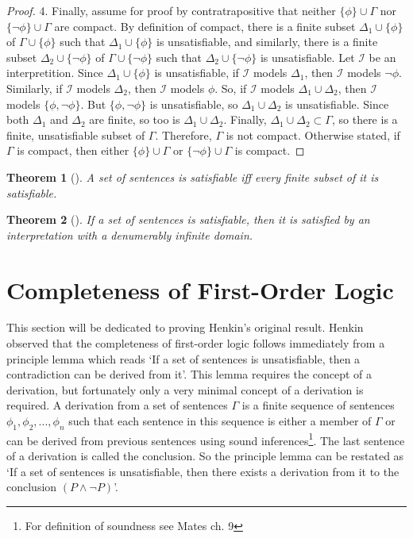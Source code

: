 \documentclass[12pt]{article}
\newtheorem{theorem}{Theorem}[section]
\theoremstyle{definition}
\theoremstyle{remark}
\begin{document}
\begin{proof}
	4. Finally, assume for proof by contratrapositive that neither $\{ \phi \} \cup \Gamma$ nor $\{ \neg\phi \} \cup \Gamma$ are compact. By definition of compact, there is a finite subset $\Delta_1 \cup \{ \phi \}$ of $\Gamma \cup \{ \phi \}$ such that $\Delta_1 \cup \{ \phi \}$ is unsatisfiable, and similarly, there is a finite subset $\Delta_2 \cup \{ \neg\phi \}$ of $\Gamma \cup \{ \neg\phi \}$ such that $\Delta_2 \cup \{ \neg\phi \}$ is unsatisfiable. Let $\mathscr{I}$ be an interpretition. Since $\Delta_1 \cup \{ \phi \}$ is unsatisfiable, if $\mathscr{I}$ models $\Delta_1$, then $\mathscr{I}$ models $\neg\phi$. Similarly, if $\mathscr{I}$ models $\Delta_2$, then $\mathscr{I}$ models $\phi$. So, if $\mathscr{I}$ models $\Delta_1 \cup \Delta_2$, then $\mathscr{I}$ models $\{ \phi, \neg\phi \}$. But $\{ \phi, \neg\phi \}$ is unsatisfiable, so $\Delta_1 \cup \Delta_2$ is unsatisfiable. Since both $\Delta_1$ and $\Delta_2$ are finite, so too is $\Delta_1 \cup \Delta_2$. Finally, $\Delta_1 \cup \Delta_2 \subset \Gamma$, so there is a finite, unsatisfiable subset of $\Gamma$. Therefore, $\Gamma$ is not compact. Otherwise stated, if $\Gamma$ is compact, then either $\{ \phi \} \cup \Gamma$ or $\{ \neg\phi \} \cup \Gamma$ is compact.
\end{proof}

\begin{theorem}[]
	A set of sentences is satisfiable iff every finite subset of it is satisfiable.
\end{theorem}

\begin{theorem}[]
	If a set of sentences is satisfiable, then it is satisfied by an interpretation with a denumerably infinite domain.
\end{theorem}

\section{Completeness of First-Order Logic}

This section will be dedicated to proving Henkin's original result. Henkin observed that the completeness of first-order logic follows immediately from a principle lemma which reads `If a set of sentences is unsatisfiable, then a contradiction can be derived from it'. This lemma requires the concept of a derivation, but fortunately only a very minimal concept of a derivation is required. A derivation from a set of sentences $\Gamma$ is a finite sequence of sentences $\phi_1, \phi_2, ..., \phi_n$ such that each sentence in this sequence is either a member of $\Gamma$ or can be derived from previous sentences using sound inferences\footnote{For definition of soundness see Mates ch. 9}. The last sentence of a derivation is called the conclusion. So the principle lemma can be restated as `If a set of sentences is unsatisfiable, then there exists a derivation from it to the conclusion $(P \land \neg P)$'.
\end{document}

